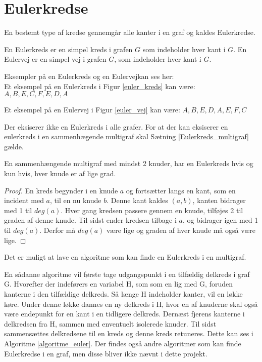 \section{Eulerkredse}

En bestemt type af kredse gennemgår alle kanter i en graf og kaldes Eulerkredse. 

\begin{defn}\label{euler_def}
En Eulerkreds er en simpel kreds i grafen $G$ som indeholder hver kant i $G$.
En Eulervej er en simpel vej i grafen $G$, som indeholder hver kant i $G$.  
\end{defn}
\noindent Eksempler på en Eulerkreds og en Eulervejkan ses her: \\


\noindent Et eksempel på en Eulerkreds i Figur \ref{euler_kreds} kan være: $A,B,E,C,F,E,D,A$



\noindent Et eksempel på en Eulervej i Figur \ref{euler_vej} kan være: $A,B,E,D,A,E,F,C$

Der eksiserer ikke en Eulerkreds i alle grafer. 
For at der kan eksiserer en eulerkreds i en sammenhægende multigraf skal Sætning \ref{Eulerkreds_multigraf} gælde. 

\begin{thm}\label{Eulerkreds_multigraf}
En sammenhængende multigraf med mindst 2 knuder, har en Eulerkreds hvis og kun hvis, hver knude er af lige grad.
\end{thm}

\begin{proof} 
En kreds begynder i en knude $a$ og fortsætter langs en kant, som en incident med $a$, til en nu knude $b$. 
Denne kant kaldes $(a,b)$, kanten bidrager med 1 til $deg(a)$. 
Hver gang kredsen passere gennem en knude, tilføjes 2 til graden af denne knude. 
Til sidst ender kredsen tilbage i $a$, og bidrager igen med 1 til $deg(a)$. 
Derfor må $deg(a)$ være lige og graden af hver knude må også være lige.  
\end{proof} 

\noindent Det er muligt at lave en algoritme som kan finde en Eulerkreds i en multigraf.

En sådanne algoritme vil første tage udgangspunkt i en tilfældig delkreds i graf G. 
Hvorefter der indeførers en variabel H, som som en lig med G, foruden kanterne i den tilfældige delkreds. 
Så længe H indeholder kanter, vil en løkke køre. 
Under denne løkke dannes en ny delkreds i H, hvor en af knuderne skal også være endepunkt for en kant i en tidligere delkreds.
Dernæst fjerens kanterne i delkredsen fra H, sammen med enventuelt isolerede knuder. 
Til sidst sammensættes delkredsene til en kreds og denne kreds retuneres.
Dette kan ses i Algoritme \ref{algoritme_euler}.
Der findes også andre algoritmer som kan finde Eulerkredse i en graf, men disse bliver ikke nævnt i dette projekt.\\
  

